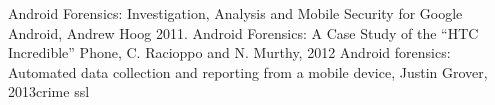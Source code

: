 
Android Forensics: Investigation, Analysis and Mobile Security for Google Android, Andrew Hoog 2011.
Android Forensics: A Case Study of the “HTC Incredible” Phone, C. Racioppo and N. Murthy, 2012
Android forensics: Automated data collection and reporting from a mobile device, Justin Grover, 2013crime ssl

